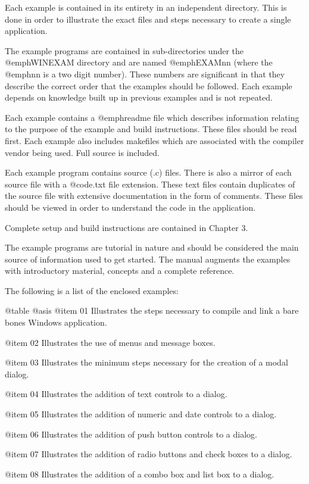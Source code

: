 Each example is contained in its entirety in an independent directory.
This is done in order to illustrate the exact files and steps necessary
to create a single application.

The example programs are contained in sub-directories under the
@emph{WINEXAM} directory and are named @emph{EXAMnn} (where the
@emph{nn} is a two digit number).  These numbers are significant in that
they describe the correct order that the examples should be followed.
Each example depends on knowledge built up in previous examples and is
not repeated.

Each example contains a @emph{readme} file which describes information
relating to the purpose of the example and build instructions.  These
files should be read first.  Each example also includes makefiles which
are associated with the compiler vendor being used.  Full source is
included.

Each example program contains source (.c) files.  There is also a mirror
of each source file with a @code{.txt} file extension.  These text files
contain duplicates of the source file with extensive documentation in
the form of comments.  These files should be viewed in order to
understand the code in the application.

Complete setup and build instructions are contained in Chapter 3.

The example programs are tutorial in nature and should be considered the
main source of information used to get started.  The manual augments the
examples with introductory material, concepts and a complete reference.

The following is a list of the enclosed examples:

@table @asis
@item 01
Illustrates the steps necessary to compile and link a bare bones
Windows application.

@item 02
Illustrates the use of menus and message boxes.

@item 03
Illustrates the minimum steps necessary for the creation of a modal dialog.

@item 04
Illustrates the addition of text controls to a dialog.

@item 05
Illustrates the addition of numeric and date controls to a dialog.

@item 06
Illustrates the addition of push button controls to a dialog.

@item 07
Illustrates the addition of radio buttons and check boxes to a dialog.

@item 08
Illustrates the addition of a combo box and list box to a dialog.

